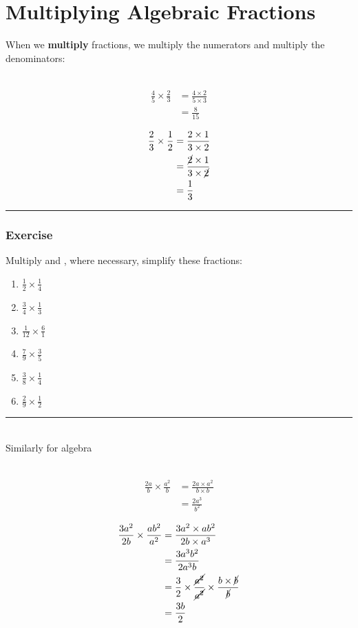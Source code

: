 \documentclass[a4paper,12pt]{article}
\newcommand\question{
	 \rule[0pt]{17cm}{0.5pt}\vspace{-0.5cm}
	\subsubsection{Exercise}

}
\newcommand\questionend{
	\rule[0pt]{17cm}{0.5pt}\vspace{0.0cm}\\
}
\begin{document}
\section{Multiplying Algebraic Fractions}
When we \textbf{multiply} fractions, we multiply the numerators and multiply the denominators:
\setlength{\columnsep}{-6cm}
\begin{multicols}{2}
	~\vspace{-1cm}
\begin{align*}
\frac{4}{5} \times \frac{2}{3}&= \frac{4 \times 2}{5 \times 3}\\
&=  \frac{8}{15} \\
\end{align*}
\begin{align*}
\frac{2}{3} \times \frac{1}{2}&= \frac{2 \times 1}{3 \times 2}\\
&=  \frac{\cancel{2} \times 1}{3 \times \cancel{2} } \\
& =  \frac{1   }{3}\\
\end{align*}
\end{multicols}\vspace{-1cm}
\setlength{\columnsep}{1cm}
\question
Multiply and , where necessary, simplify these fractions:\\
\begin{multicols}{3}
	\begin{enumerate}[label=\normalsize \alph*)~~~ , topsep=8pt,itemsep=25pt,partopsep=4pt, parsep=4pt]
		\item $\displaystyle \frac{1}{2} \times \frac{1}{4}$
		\item $\displaystyle  \frac{3}{4} \times \frac{1}{3}$
		\item $\displaystyle \frac{1}{12} \times \frac{6}{1}$
		\item $\displaystyle \frac{7}{9} \times \frac{3}{5}$
		\item $\displaystyle \frac{3}{8} \times \frac{1}{4}$
		\item$\displaystyle \frac{2}{9} \times \frac{1}{2}$
	\end{enumerate}
\end{multicols}\vspace{0.5cm}
\questionend
Similarly for algebra
\setlength{\columnsep}{-4cm}
\begin{multicols}{2}
	~\vspace{-1cm}
	\begin{align*}
		\frac{2a}{b} \times \frac{a^2}{b}&= \frac{2a \times a^2}{b \times b}\\
		&=  \frac{2a^3}{b^2} \\
	\end{align*}
	\begin{align*}
		\frac{3a^2}{2b} \times \frac{ab^2}{a^2}&= \frac{3a^2  \times ab^2 }{2b \times a^3}\\
		&= \frac{3a^3b^2 }{2a^3b}\\
		& = \frac{3 }{2} \times \frac{\cancel{a^2} }{ \cancel{a^2} } \times \frac{b \times \cancel{b} }{\cancel{b}}\\
		& = \frac{3b}{2}
	\end{align*}
\end{multicols}
\end{document}
